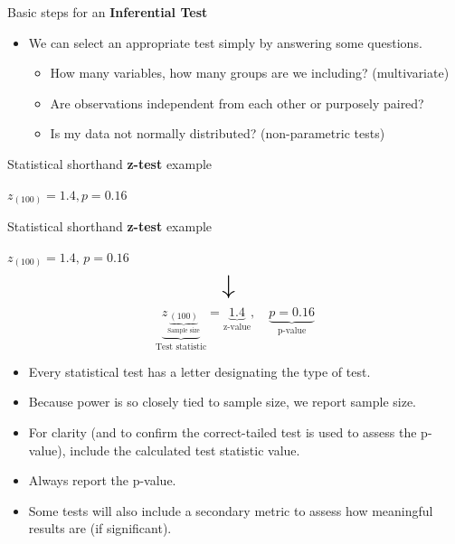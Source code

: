 \documentclass[
  ignorenonframetext,
]{beamer}
\providecommand{\tightlist}{%
  \setlength{\itemsep}{0pt}\setlength{\parskip}{0pt}}
\begin{document}
\begin{frame}{Basic steps for an \textbf{Inferential Test}}
\label{basic-steps-for-an-inferential-test-2}
\begin{itemize}
\item
  We can select an appropriate test simply by answering some questions.

  \begin{itemize}
  \item
    How many variables, how many groups are we including? (multivariate)
  \item
    Are observations independent from each other or purposely paired?
  \item
    Is my data not normally distributed? (non-parametric tests)
  \end{itemize}
\end{itemize}
\end{frame}

\begin{frame}{Statistical shorthand \textbf{z-test} example}
\label{statistical-shorthand-z-test-example}
\centering

\(z_{(100)} = 1.4, p = 0.16\)\\
\end{frame}

\begin{frame}{Statistical shorthand \textbf{z-test} example}
\label{statistical-shorthand-z-test-example-1}
\centering

\(z_{(100)} = 1.4, \, p = 0.16\) \[
\text{\huge $\downarrow$} \quad
\] \centering \[
\underbrace{z_{\underbrace{(100)}_{\text{Sample size}}}}_{\text{Test statistic}} = \underbrace{1.4}_{\text{z-value}}, \quad \underbrace{p = 0.16}_{\text{p-value}}
\]

\begin{itemize}
\tightlist
\item
  Every statistical test has a letter designating the type of test.
\item
  Because power is so closely tied to sample size, we report sample
  size.
\item
  For clarity (and to confirm the correct-tailed test is used to assess
  the p-value), include the calculated test statistic value.
\item
  Always report the p-value.
\item
  Some tests will also include a secondary metric to assess how
  meaningful results are (if significant).
\end{itemize}
\end{frame}
\end{document}
